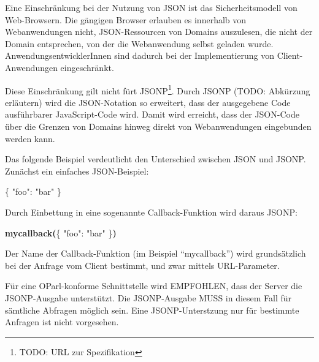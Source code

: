 \documentclass[,a4paper]{article}
\newenvironment{Shaded}{}{}
\newcommand{\DataTypeTok}[1]{\textcolor[rgb]{0.56,0.13,0.00}{{#1}}}
\newcommand{\StringTok}[1]{\textcolor[rgb]{0.25,0.44,0.63}{{#1}}}
\newcommand{\ErrorTok}[1]{\textcolor[rgb]{1.00,0.00,0.00}{\textbf{{#1}}}}
\newcommand{\NormalTok}[1]{{#1}}
\begin{document}

Eine Einschränkung bei der Nutzung von JSON ist das Sicherheitsmodell
von Web-Browsern. Die gängigen Browser erlauben es innerhalb von
Webanwendungen nicht, JSON-Ressourcen von Domains auszulesen, die nicht
der Domain entsprechen, von der die Webanwendung selbst geladen wurde.
AnwendungsentwicklerInnen sind dadurch bei der Implementierung von
Client-Anwendungen eingeschränkt.

Diese Einschränkung gilt nicht fürt JSONP\footnote{TODO: URL zur
  Spezifikation}. Durch JSONP (TODO: Abkürzung erläutern) wird die
JSON-Notation so erweitert, dass der ausgegebene Code ausführbarer
JavaScript-Code wird. Damit wird erreicht, dass der JSON-Code über die
Grenzen von Domains hinweg direkt von Webanwendungen eingebunden werden
kann.

Das folgende Beispiel verdeutlicht den Unterschied zwischen JSON und
JSONP. Zunächst ein einfaches JSON-Beispiel:

\begin{Shaded}
\begin{Highlighting}[]
\NormalTok{\{}
    \DataTypeTok{"foo"}\NormalTok{: }\StringTok{"bar"}
\NormalTok{\}}
\end{Highlighting}
\end{Shaded}

Durch Einbettung in eine sogenannte Callback-Funktion wird daraus JSONP:

\begin{Shaded}
\begin{Highlighting}[]
\ErrorTok{mycallback(}\NormalTok{\{}
    \DataTypeTok{"foo"}\NormalTok{: }\StringTok{"bar"}
\NormalTok{\}}\ErrorTok{)}
\end{Highlighting}
\end{Shaded}

Der Name der Callback-Funktion (im Beispiel ``mycallback'') wird
grundsätzlich bei der Anfrage vom Client bestimmt, und zwar mittels
URL-Parameter.

Für eine OParl-konforme Schnittstelle wird EMPFOHLEN, dass der Server
die JSONP-Ausgabe unterstützt. Die JSONP-Ausgabe MUSS in diesem Fall für
sämtliche Abfragen möglich sein. Eine JSONP-Unterstzung nur für
bestimmte Anfragen ist nicht vorgesehen.
\end{document}
